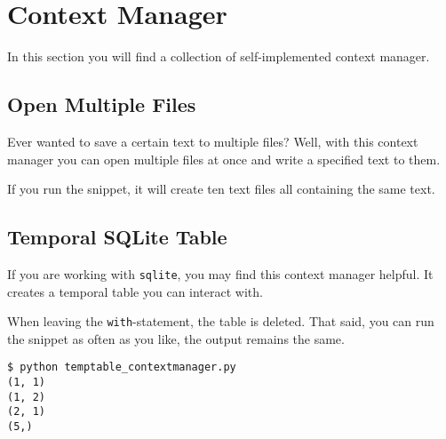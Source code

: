 
\section{Context Manager}

In this section you will find a collection of self-implemented context manager.


\subsection{Open Multiple Files}

Ever wanted to save a certain text to multiple files?
Well, with this context manager you can open multiple files at once and write a specified text to them.



If you run the snippet, it will create ten text files all containing the same text.


\subsection{Temporal SQLite Table}

If you are working with \lstinline{sqlite}, you may find this context manager helpful.
It creates a temporal table you can interact with.



When leaving the \lstinline{with}-statement, the table is deleted.
That said, you can run the snippet as often as you like, the output remains the same.

\begin{lstlisting}[caption=Output of temptable\_contextmanager.py]
$ python temptable_contextmanager.py
(1, 1)
(1, 2)
(2, 1)
(5,)
\end{lstlisting}
